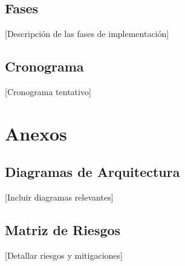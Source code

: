 \subsection{Fases}
[Descripción de las fases de implementación]

\subsection{Cronograma}
[Cronograma tentativo]

\section{Anexos}
\subsection{Diagramas de Arquitectura}
[Incluir diagramas relevantes]

\subsection{Matriz de Riesgos}
[Detallar riesgos y mitigaciones]

